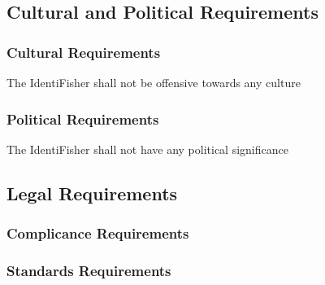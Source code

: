 \documentclass{article}
\begin{document}
\subsection{Cultural and Political Requirements}
\subsubsection{Cultural Requirements}
The IdentiFisher shall not be offensive towards any culture
\subsubsection{Political Requirements}
The IdentiFisher shall not have any political significance

\subsection{Legal Requirements}
\subsubsection{Complicance Requirements}
\subsubsection{Standards Requirements}
\end{document}
